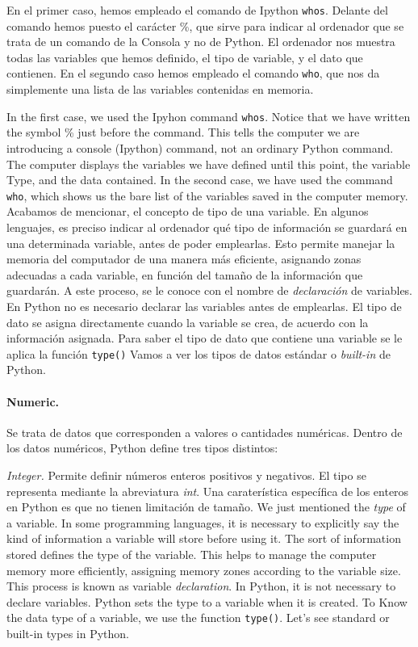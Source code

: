 \begin{paracol}{2}
 En el primer caso, hemos empleado el comando de Ipython \texttt{whos}. Delante del comando hemos puesto el carácter \%, que sirve para indicar al ordenador que se trata de un comando de la Consola y no de Python. El ordenador nos muestra todas las variables que hemos definido, el tipo de variable, y el dato que contienen. En el segundo caso hemos empleado el comando \texttt{who}, que nos da simplemente una lista de las variables contenidas en memoria. 

 \switchcolumn
 In the first case, we used the Ipyhon command \texttt{whos}. Notice that we have written the symbol \% just before the command. This tells the computer we are introducing a console (Ipython) command, not an ordinary Python command. The computer displays the variables we have defined until this point, the variable Type, and the data contained. In the second case, we have used the command \texttt{who}, which shows us the bare list of the variables saved in the computer memory.
 \switchcolumn Acabamos de mencionar, el concepto de tipo de una variable. En algunos lenguajes, es preciso indicar al ordenador qué tipo de información se guardará en una determinada variable, antes de poder emplearlas. Esto permite manejar la memoria del computador de una manera más eficiente, asignando zonas adecuadas a cada variable, en función del tamaño de la información que guardarán. A este proceso, se le conoce con el nombre de \emph{declaración} de variables. En Python no es necesario declarar las variables antes de emplearlas. El tipo de dato se asigna directamente cuando la variable se crea, de acuerdo con la información asignada. Para saber el tipo de dato que contiene una variable se le aplica la función \texttt{type()} Vamos a ver los tipos de datos estándar o \emph{built-in} de Python.

\paragraph{Numeric.} Se trata de datos que corresponden a valores o cantidades numéricas. Dentro de los datos numéricos, Python define tres tipos distintos:

\emph{Integer.} Permite definir números enteros positivos y negativos. El tipo se representa mediante la abreviatura \emph{int}. Una caraterística específica de los enteros en Python es que no tienen limitación de tamaño.
\switchcolumn
We just mentioned the \emph{type} of a variable. In some programming languages, it is necessary to explicitly say the kind of information a variable will store before using it. The sort of information stored defines the type of the variable. This helps to manage the computer memory more efficiently, assigning memory zones according to the variable size. This process is known as variable \emph{declaration}. In Python, it is not necessary to declare variables. Python sets the type to a variable when it is created. To Know the data type of a variable, we use the function \texttt{type()}. Let's see standard or built-in types in Python.


\end{paracol}
